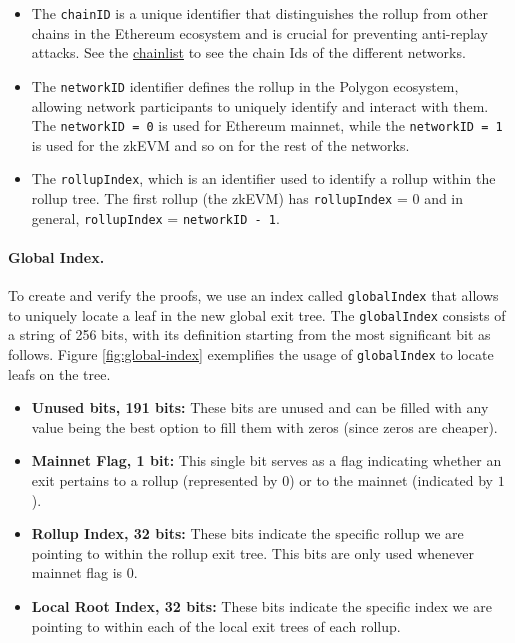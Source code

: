 \begin{itemize}

\item The \texttt{chainID} is a unique identifier that distinguishes the rollup
from other chains in the Ethereum ecosystem and is crucial for preventing
anti-replay attacks. See the \href{https://chainlist.org/}{chainlist} to see
the chain Ids of the different networks.

\item The \texttt{networkID} identifier defines the rollup in the Polygon
ecosystem, allowing network participants to uniquely identify and interact with
them. The \texttt{networkID = 0} is used for Ethereum mainnet, while the
\texttt{networkID = 1} is used for the zkEVM and so on for the rest of the
networks.

\item The \texttt{rollupIndex}, which is an identifier used to identify a
rollup within the rollup tree. The first rollup (the zkEVM) has
\texttt{rollupIndex} = $0$ and in general, \texttt{rollupIndex} =
\texttt{networkID - 1}.

\end{itemize}


\paragraph*{Global Index.} To create and verify the proofs, we use an index
called \texttt{globalIndex} that allows to uniquely locate a leaf in the new
global exit tree. The \texttt{globalIndex} consists of a string of 256 bits,
with its definition starting from the most significant bit as follows. Figure
\ref{fig:global-index} exemplifies the usage of \texttt{globalIndex} to locate
leafs on the tree.

\begin{itemize}

\item \textbf{Unused bits, 191 bits:} These bits are unused and can be filled
with any value being the best option to fill them with zeros (since zeros are
cheaper).

\item \textbf{Mainnet Flag, 1 bit:} This single bit serves as a flag indicating whether an exit pertains to a rollup (represented by $0$) or to the mainnet (indicated by $1$).

\item \textbf{Rollup Index, 32 bits:} These bits indicate the specific rollup we are pointing to within the rollup exit tree. This bits are only used whenever mainnet flag is $0$.

\item \textbf{Local Root Index, 32 bits:} These bits indicate the specific index we are pointing to within each of the local exit trees of each rollup.

\end{itemize}

